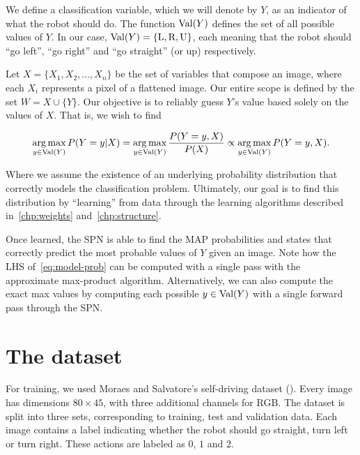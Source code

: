 We define a classification variable, which we will denote by $Y$, as an indicator of what the robot
should do. The function $\operatorname*{\text{Val}}(Y)$ defines the set of all possible values of $Y$. In our case,
$\operatorname*{\text{Val}}(Y)=\{\text{L},\text{R}, \text{U}\}$, each meaning that the robot should ``go left'', ``go right'' and
``go straight'' (or up) respectively.

Let $X=\{X_1,X_2,\ldots,X_n\}$ be the set of variables that compose an image, where each $X_i$
represents a pixel of a flattened image. Our entire scope is defined by the set $W=X\cup \{Y\}$.
Our objective is to reliably guess $Y$'s value based solely on the values of $X$. That is, we wish
to find

\begin{equation}\label{eq:model-prob}
  \operatorname*{arg\,max}_{y\in\operatorname*{\text{Val}}(Y)} P(Y=y|X) = \operatorname*{arg\,max}_{y\in\operatorname*{\text{Val}}(Y)} \frac{P(Y=y,X)}{P(X)}\propto
  \operatorname*{arg\,max}_{y\in\operatorname*{\text{Val}}(Y)} P(Y=y,X).
\end{equation}

Where we assume the existence of an underlying probability distribution that correctly models the
classification problem. Ultimately, our goal is to find this distribution by ``learning'' from data
through the learning algorithms described in~\autoref{chp:weights} and~\autoref{chp:structure}.

Once learned, the SPN is able to find the MAP probabilities and states that correctly predict the
most probable values of $Y$ given an image. Note how the LHS of~\autoref{eq:model-prob} can be
computed with a single pass with the approximate max-product algorithm. Alternatively, we can also
compute the exact max values by computing each possible $y\in\operatorname*{\text{Val}}(Y)$ with a single forward pass
through the SPN.

\section{The dataset}

For training, we used Moraes and Salvatore's self-driving dataset (\cite{self-driving}). Every
image has dimensions $80\times 45$, with three additional channels for RGB. The dataset is split
into three sets, corresponding to training, test and validation data. Each image contains a label
indicating whether the robot should go straight, turn left or turn right. These actions are labeled
as $0$, $1$ and $2$.

